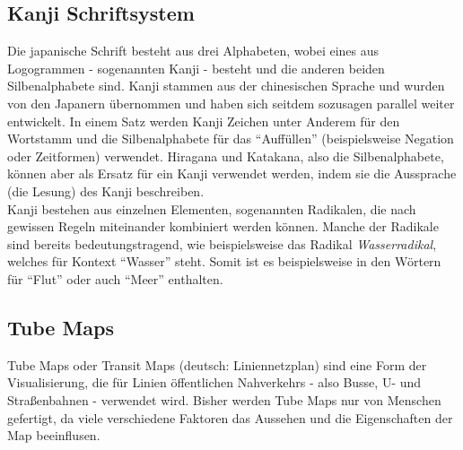 \subsection{Kanji Schriftsystem}
Die japanische Schrift besteht aus drei Alphabeten, wobei eines aus Logogrammen - sogenannten Kanji - besteht und die anderen beiden Silbenalphabete sind. Kanji stammen aus der chinesischen Sprache und wurden von den Japanern übernommen und haben sich seitdem sozusagen parallel weiter entwickelt. In einem Satz werden Kanji Zeichen unter Anderem für den Wortstamm und die Silbenalphabete für das "`Auffüllen"' (beispielsweise Negation oder Zeitformen) verwendet. Hiragana und Katakana, also die Silbenalphabete, können aber als Ersatz für ein Kanji verwendet werden, indem sie die Aussprache (die Lesung) des Kanji beschreiben. \\
Kanji bestehen aus einzelnen Elementen, sogenannten Radikalen, die nach gewissen Regeln miteinander kombiniert werden können. Manche der Radikale sind bereits bedeutungstragend, wie beispielsweise das Radikal \emph{Wasserradikal}, welches für Kontext "`Wasser"' steht. Somit ist es beispielsweise in den Wörtern für "`Flut"' oder auch "`Meer"' enthalten. 

\subsection{Tube Maps}
Tube Maps oder Transit Maps (deutsch: Liniennetzplan) sind eine Form der Visualisierung, die für Linien öffentlichen Nahverkehrs - also Busse, U- und Straßenbahnen - verwendet wird. Bisher werden Tube Maps nur von Menschen gefertigt, da viele verschiedene Faktoren das Aussehen und die Eigenschaften der Map beeinflusen.  

